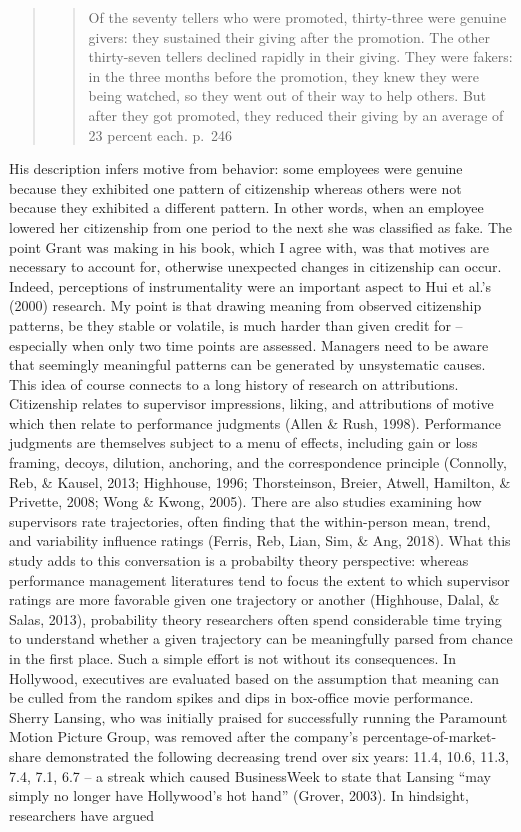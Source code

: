 \documentclass[english,,man]{apa6}
\begin{document}
\begin{quote}
\begin{quote}
Of the seventy tellers who were promoted, thirty-three were genuine givers: they sustained their giving after the promotion. The other thirty-seven tellers declined rapidly in their giving. They were fakers: in the three months before the promotion, they knew they were being watched, so they went out of their way to help others. But after they got promoted, they reduced their giving by an average of 23 percent each. p.~246
\end{quote}
\end{quote}

His description infers motive from behavior: some employees were genuine because they exhibited one pattern of citizenship whereas others were not because they exhibited a different pattern. In other words, when an employee lowered her citizenship from one period to the next she was classified as fake. The point Grant was making in his book, which I agree with, was that motives are necessary to account for, otherwise unexpected changes in citizenship can occur. Indeed, perceptions of instrumentality were an important aspect to Hui et al.'s (2000) research. My point is that drawing meaning from observed citizenship patterns, be they stable or volatile, is much harder than given credit for -- especially when only two time points are assessed. Managers need to be aware that seemingly meaningful patterns can be generated by unsystematic causes. This idea of course connects to a long history of research on attributions. Citizenship relates to supervisor impressions, liking, and attributions of motive which then relate to performance judgments (Allen \& Rush, 1998). Performance judgments are themselves subject to a menu of effects, including gain or loss framing, decoys, dilution, anchoring, and the correspondence principle (Connolly, Reb, \& Kausel, 2013; Highhouse, 1996; Thorsteinson, Breier, Atwell, Hamilton, \& Privette, 2008; Wong \& Kwong, 2005). There are also studies examining how supervisors rate trajectories, often finding that the within-person mean, trend, and variability influence ratings (Ferris, Reb, Lian, Sim, \& Ang, 2018). What this study adds to this conversation is a probabilty theory perspective: whereas performance management literatures tend to focus the extent to which supervisor ratings are more favorable given one trajectory or another (Highhouse, Dalal, \& Salas, 2013), probability theory researchers often spend considerable time trying to understand whether a given trajectory can be meaningfully parsed from chance in the first place. Such a simple effort is not without its consequences. In Hollywood, executives are evaluated based on the assumption that meaning can be culled from the random spikes and dips in box-office movie performance. Sherry Lansing, who was initially praised for successfully running the Paramount Motion Picture Group, was removed after the company's percentage-of-market-share demonstrated the following decreasing trend over six years: 11.4, 10.6, 11.3, 7.4, 7.1, 6.7 -- a streak which caused BusinessWeek to state that Lansing \enquote{may simply no longer have Hollywood's hot hand} (Grover, 2003). In hindsight, researchers have argued 
\end{document}

